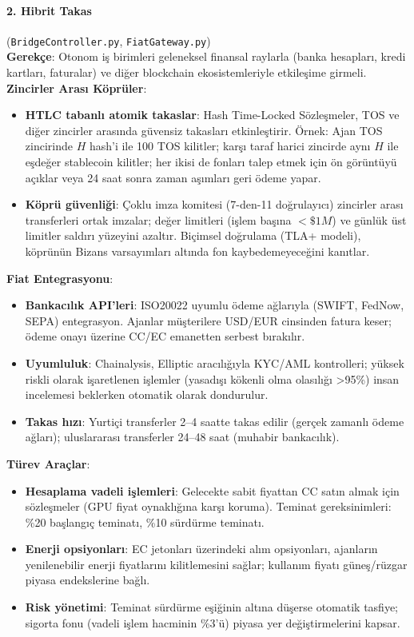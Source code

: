 \documentclass[11pt]{article}
\begin{document}
\paragraph{2. Hibrit Takas} (\texttt{BridgeController.py}, \texttt{FiatGateway.py})\\
\textbf{Gerekçe}: Otonom iş birimleri geleneksel finansal raylarla (banka hesapları, kredi kartları, faturalar) ve diğer blockchain ekosistemleriyle etkileşime girmeli.\\
\textbf{Zincirler Arası Köprüler}:
\begin{itemize}[noitemsep]
  \item \textbf{HTLC tabanlı atomik takaslar}: Hash Time-Locked Sözleşmeler, TOS ve diğer zincirler arasında güvensiz takasları etkinleştirir. Örnek: Ajan TOS zincirinde $H$ hash'i ile 100 TOS kilitler; karşı taraf harici zincirde aynı $H$ ile eşdeğer stablecoin kilitler; her ikisi de fonları talep etmek için ön görüntüyü açıklar veya 24 saat sonra zaman aşımları geri ödeme yapar.
  \item \textbf{Köprü güvenliği}: Çoklu imza komitesi (7-den-11 doğrulayıcı) zincirler arası transferleri ortak imzalar; değer limitleri (işlem başına $<\$1M$) ve günlük üst limitler saldırı yüzeyini azaltır. Biçimsel doğrulama (TLA+ modeli), köprünün Bizans varsayımları altında fon kaybedemeyeceğini kanıtlar.
\end{itemize}
\textbf{Fiat Entegrasyonu}:
\begin{itemize}[noitemsep]
  \item \textbf{Bankacılık API'leri}: ISO20022 uyumlu ödeme ağlarıyla (SWIFT, FedNow, SEPA) entegrasyon. Ajanlar müşterilere USD/EUR cinsinden fatura keser; ödeme onayı üzerine CC/EC emanetten serbest bırakılır.
  \item \textbf{Uyumluluk}: Chainalysis, Elliptic aracılığıyla KYC/AML kontrolleri; yüksek riskli olarak işaretlenen işlemler (yasadışı kökenli olma olasılığı >95\%) insan incelemesi beklerken otomatik olarak dondurulur.
  \item \textbf{Takas hızı}: Yurtiçi transferler 2--4 saatte takas edilir (gerçek zamanlı ödeme ağları); uluslararası transferler 24--48 saat (muhabir bankacılık).
\end{itemize}
\textbf{Türev Araçlar}:
\begin{itemize}[noitemsep]
  \item \textbf{Hesaplama vadeli işlemleri}: Gelecekte sabit fiyattan CC satın almak için sözleşmeler (GPU fiyat oynaklığına karşı koruma). Teminat gereksinimleri: \%20 başlangıç teminatı, \%10 sürdürme teminatı.
  \item \textbf{Enerji opsiyonları}: EC jetonları üzerindeki alım opsiyonları, ajanların yenilenebilir enerji fiyatlarını kilitlemesini sağlar; kullanım fiyatı güneş/rüzgar piyasa endekslerine bağlı.
  \item \textbf{Risk yönetimi}: Teminat sürdürme eşiğinin altına düşerse otomatik tasfiye; sigorta fonu (vadeli işlem hacminin \%3'ü) piyasa yer değiştirmelerini kapsar.
\end{itemize}
\end{document}
